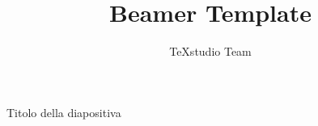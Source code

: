 \documentclass{beamer}
\title{Beamer Template}
\author{TeXstudio Team}
\begin{document}

\begin{frame}[plain] 
	\maketitle
\end{frame}
				
\begin{frame}{Titolo della diapositiva}
					
\end{frame}
\end{document}

